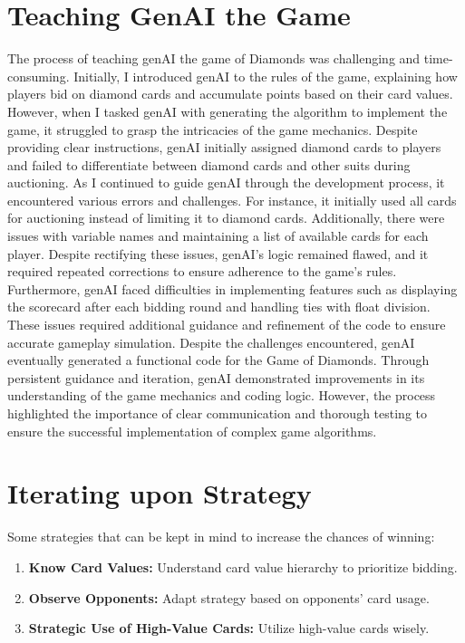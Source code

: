\documentclass[12pt]{article}
\begin{document}
\section{\textcolor{myblue}{Teaching GenAI the Game}}
The process of teaching genAI the game of Diamonds was challenging and time-consuming. Initially, I introduced genAI to the rules of the game, explaining how players bid on diamond cards and accumulate points based on their card values. However, when I tasked genAI with generating the algorithm to implement the game, it struggled to grasp the intricacies of the game mechanics. Despite providing clear instructions, genAI initially assigned diamond cards to players and failed to differentiate between diamond cards and other suits during auctioning. As I continued to guide genAI through the development process, it encountered various errors and challenges. For instance, it initially used all cards for auctioning instead of limiting it to diamond cards. Additionally, there were issues with variable names and maintaining a list of available cards for each player. Despite rectifying these issues, genAI's logic remained flawed, and it required repeated corrections to ensure adherence to the game's rules. Furthermore, genAI faced difficulties in implementing features such as displaying the scorecard after each bidding round and handling ties with float division. These issues required additional guidance and refinement of the code to ensure accurate gameplay simulation. Despite the challenges encountered, genAI eventually generated a functional code for the Game of Diamonds. Through persistent guidance and iteration, genAI demonstrated improvements in its understanding of the game mechanics and coding logic. However, the process highlighted the importance of clear communication and thorough testing to ensure the successful implementation of complex game algorithms.

\section{\textcolor{myblue}{Iterating upon Strategy}}
Some strategies that can be kept in mind to increase the chances of winning:
\begin{enumerate}
    \item \textbf{Know Card Values:} Understand card value hierarchy to prioritize bidding.
    \item \textbf{Observe Opponents:} Adapt strategy based on opponents' card usage.
    \item \textbf{Strategic Use of High-Value Cards:} Utilize high-value cards wisely.
\end{enumerate}
\end{document}
